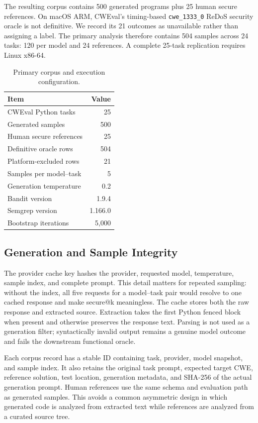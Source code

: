 \documentclass[sigconf,nonacm]{acmart}
\begin{document}
The resulting corpus contains 500 generated programs plus 25 human secure
references. On macOS ARM, CWEval's timing-based \texttt{cwe\_1333\_0} ReDoS
security oracle is not definitive. We record its 21 outcomes as unavailable
rather than assigning a label. The primary analysis therefore contains 504
samples across 24 tasks: 120 per model and 24 references. A complete 25-task
replication requires Linux x86-64.

\begin{table}[t]
\caption{Primary corpus and execution configuration.}
\label{tab:corpus}
\centering
\small
\begin{tabular}{lr}
\toprule
Item & Value \\
\midrule
CWEval Python tasks & 25 \\
Generated samples & 500 \\
Human secure references & 25 \\
Definitive oracle rows & 504 \\
Platform-excluded rows & 21 \\
Samples per model--task & 5 \\
Generation temperature & 0.2 \\
Bandit version & 1.9.4 \\
Semgrep version & 1.166.0 \\
Bootstrap iterations & 5,000 \\
\bottomrule
\end{tabular}
\end{table}

\subsection{Generation and Sample Integrity}

The provider cache key hashes the provider, requested model, temperature,
sample index, and complete prompt. This detail matters for repeated sampling:
without the index, all five requests for a model--task pair would resolve to
one cached response and make secure@k meaningless. The cache stores both the
raw response and extracted source. Extraction takes the first Python fenced
block when present and otherwise preserves the response text. Parsing is not
used as a generation filter; syntactically invalid output remains a genuine
model outcome and fails the downstream functional oracle.

Each corpus record has a stable ID containing task, provider, model snapshot,
and sample index. It also retains the original task prompt, expected target
CWE, reference solution, test location, generation metadata, and SHA-256 of the
actual generation prompt. Human references use the same schema and evaluation
path as generated samples. This avoids a common asymmetric design in which
generated code is analyzed from extracted text while references are analyzed
from a curated source tree.
\end{document}
